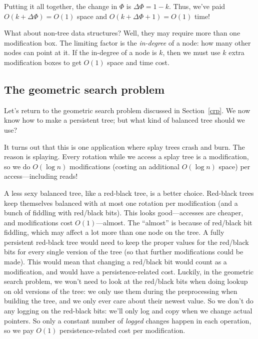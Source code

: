 \documentclass{article}
\begin{document}
Putting it all together, the change in $\Phi$ is $\Delta\Phi = 1 -
k$. Thus, we've paid $O(k + \Delta\Phi) = O(1)$ space and $O(k +
\Delta\Phi + 1) = O(1)$ time!

What about non-tree data structures? Well, they may require more than one
modification box. The limiting factor is the \emph{in-degree} of a node:
how many other nodes can point at it. If the in-degree of a node is $k$,
then we must use $k$ extra modification boxes to get $O(1)$ space and time
cost.


\subsection{The geometric search problem}

Let's return to the geometric search problem discussed in
Section~\ref{crp}. We now know how to make a persistent tree; but what kind
of balanced tree should we use?

It turns out that this is one application where splay trees crash and
burn.  The reason is splaying.  Every rotation while we access a splay
tree is a modification, so we do $O(\log n)$ modifications (costing an
additional $O(\log n)$ space) per access---including reads!

A less sexy balanced tree, like a red-black tree, is a better choice.
Red-black trees keep themselves balanced with at most one rotation per
modification (and a bunch of fiddling with red/black bits). This looks
good---accesses are cheaper, and modifications cost $O(1)$---almost. The
``almost'' is because of red/black bit fiddling, which may affect a lot
more than one node on the tree. A fully persistent red-black tree would
need to keep the proper values for the red/black bits for every single
version of the tree (so that further modifications could be made). This
would mean that changing a red/black bit would count as a modification, and
would have a persistence-related cost. Luckily, in the geometric search
problem, we won't need to look at the red/black bits when doing lookup
on old versions of the tree: we only use them during the preprocessing when
building the tree, and we only ever care about their newest value.
So we don't do any logging on the red-black bits: we'll only log and copy
when we change actual pointers.
So only a constant number of \emph{logged} changes happen in each operation,
so we pay $O(1)$ persistence-related cost per modification.
\end{document}
